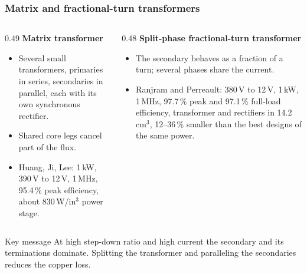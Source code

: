 \begin{frame}
	\frametitle{Matrix and fractional-turn transformers}
	\begin{columns}[T]
		\begin{column}{0.49\textwidth}
			\small
			\textbf{Matrix transformer}
			\begin{itemize}
				\item Several small transformers, primaries in series, secondaries in parallel, each with its own synchronous rectifier.
				\item Shared core legs cancel part of the flux.
				\item Huang, Ji, Lee: 1\,kW, 390\,V to 12\,V, 1\,MHz, 95.4\,\% peak efficiency, about 830\,W/in$^3$ power stage.
			\end{itemize}
		\end{column}
		\begin{column}{0.48\textwidth}
			\small
			\textbf{Split-phase fractional-turn transformer}
			\begin{itemize}
				\item The secondary behaves as a fraction of a turn; several phases share the current.
				\item Ranjram and Perreault: 380\,V to 12\,V, 1\,kW, 1\,MHz, 97.7\,\% peak and 97.1\,\% full-load efficiency, transformer and rectifiers in 14.2\,cm$^3$, 12--36\,\% smaller than the best designs of the same power.
			\end{itemize}
		\end{column}
	\end{columns}
	\begin{block}{Key message}
		At high step-down ratio and high current the secondary and its terminations dominate. Splitting the transformer and paralleling the secondaries reduces the copper loss.
	\end{block}
\end{frame}

